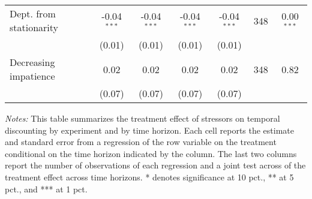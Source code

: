\begin{table}[htbp]
{\begin{threeparttable}
\begin{tabular}{l*{6}{c}}
Dept. from stationarity&-0.04$^{***}$&-0.04$^{***}$&-0.04$^{***}$&-0.04$^{***}$&      348&0.00$^{***}$\\
          &   (0.01)&   (0.01)&   (0.01)&   (0.01)&         &         \\
Decreasing impatience&     0.02&     0.02&     0.02&     0.02&      348&     0.82\\
          &   (0.07)&   (0.07)&   (0.07)&   (0.07)&         &         \\
\bottomrule \end{tabular} \begin{tablenotes}[flushleft] \footnotesize \item \emph{Notes:} This table summarizes the treatment effect of stressors on temporal discounting by experiment and by time horizon. Each cell reports the estimate and standard error from a regression of the row variable on the treatment conditional on the time horizon indicated by the column. The last two columns report the number of observations of each regression and a joint test across of the treatment effect across time horizons. * denotes significance at 10 pct., ** at 5 pct., and *** at 1 pct. \end{tablenotes} \end{threeparttable} } \end{table}

